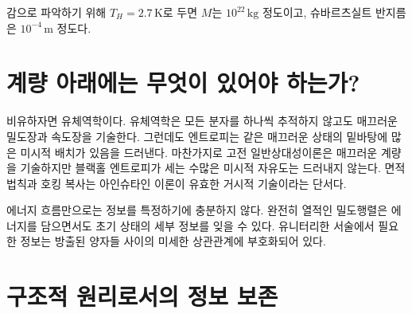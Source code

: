 감으로 파악하기 위해 \(T_H=2.7\,\mathrm{K}\)로 두면 \(M\)는 \(10^{22}\,\mathrm{kg}\) 정도이고, 슈바르츠실트 반지름은 \(10^{-4}\,\mathrm{m}\) 정도다.

\section{계량 아래에는 무엇이 있어야 하는가?}

\begin{classroomqa}\end{classroomqa}

비유하자면 유체역학이다. 유체역학은 모든 분자를 하나씩 추적하지 않고도 매끄러운 밀도장과 속도장을 기술한다. 그런데도 엔트로피는 같은 매끄러운 상태의 밑바탕에 많은 미시적 배치가 있음을 드러낸다. 마찬가지로 고전 일반상대성이론은 매끄러운 계량을 기술하지만 블랙홀 엔트로피가 세는 수많은 미시적 자유도는 드러내지 않는다. 면적 법칙과 호킹 복사는 아인슈타인 이론이 유효한 거시적 기술이라는 단서다.

\begin{classroomqa}\end{classroomqa}

에너지 흐름만으로는 정보를 특정하기에 충분하지 않다. 완전히 열적인 밀도행렬은 에너지를 담으면서도 초기 상태의 세부 정보를 잊을 수 있다. 유니터리한 서술에서 필요한 정보는 방출된 양자들 사이의 미세한 상관관계에 부호화되어 있다.

\section{구조적 원리로서의 정보 보존}

